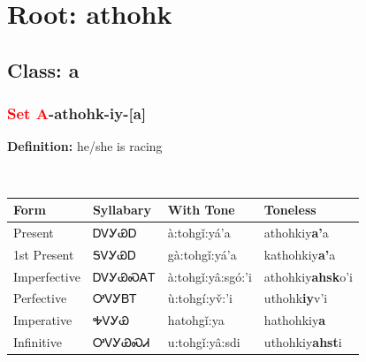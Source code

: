 \needspace{4in}
\section*{Root: athohk}
\nopagebreak
{}
\needspace{3in}
\subsection*{Class: a}
\nopagebreak
\needspace{2in}
\subsubsection*{\textcolor{Red}{Set A}{-}\textbf{athohk}{-}iy{-}[a]}
\nopagebreak
\textbf{Definition: } he/she is racing
\\[0.5em]
\begin{tabularx}{\textwidth}{l X X X}%
\toprule%
\textbf{Form}&\textbf{Syllabary}&\textbf{With Tone}&\textbf{Toneless}\\%
\midrule%
Present&ᎠᏙᎩᏯᎠ&à:tohgǐ:yá’a&athohkiy\textbf{a'}a\\%
1st Present&ᎦᏙᎩᏯᎠ&gà:tohgǐ:yá’a&kathohkiy\textbf{a'}a\\%
Imperfective&ᎠᏙᎩᏯᏍᎪᎢ&à:tohgǐ:yâ:sgó:’i&athohkiy\textbf{ahsk}o'i\\%
Perfective&ᎤᏙᎩᏴᎢ&ù:tohgí:yv̌:’i&uthohk\textbf{iy}v'i\\%
Imperative&ᎭᏙᎩᏯ&hatohgǐ:ya&hathohkiy\textbf{a}\\%
Infinitive&ᎤᏙᎩᏯᏍᏗ&u:tohgǐ:yâ:sdi&uthohkiy\textbf{ahst}i\\%
\bottomrule%
\end{tabularx}
\\[1em]